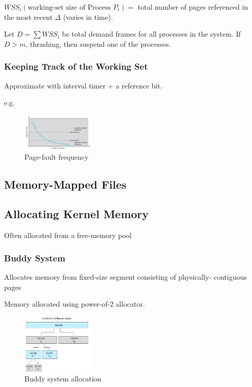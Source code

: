 $WSS_i(\text{working-set size of Process }P_i)=$ total number of pages referenced in the most recent $\Delta$ (varies in time). 

Let $D=\sum WSS_i$ be total demand frames for all processes in the system. If $D>m$, thrashing, then suspend one of the processes. 

\subsubsection{Keeping Track of the Working Set}
Approximate with interval timer + a reference bit. 

e.g. %

\begin{figure}[!htb]
    \centering
    \includegraphics[width=0.309\textwidth]{pic/OS9/Page-fault frequency}
    \caption{Page-fault frequency}
\end{figure}



\subsection{Memory-Mapped Files}

\subsection{Allocating Kernel Memory}
Often allocated from a free-memory pool

\subsubsection{Buddy System}
Allocates memory from fixed-size segment consisting of physically- contiguous pages

Memory allocated using power-of-2 allocator. 

\begin{figure}[!htb]
    \centering
    \includegraphics[width=0.309\textwidth]{pic/OS9/Buddy system allocation}
    \caption{Buddy system allocation}
\end{figure}

